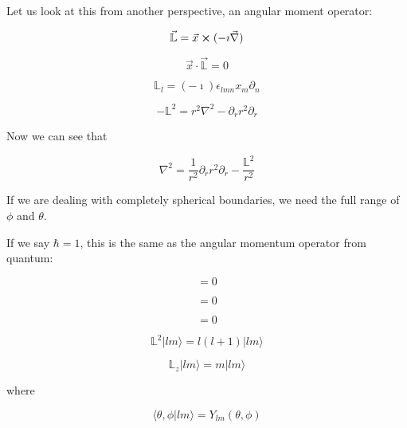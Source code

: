 \documentclass[a4paper,twoside,master.tex]{subfiles}
\begin{document}
Let us look at this from another perspective, an angular moment operator:

\begin{equation}
   \vec{\mathbb{L}} = \vec{x}\cross(-\imath\vec{\nabla})
\end{equation}

\begin{equation}
    \vec{x}\cdot\vec{\mathbb{L}} = 0
\end{equation}

\begin{equation}
    \mathbb{L}_l = (-\imath)\epsilon_{lmn}x_m\partial_n
\end{equation}

\begin{equation}
    -\mathbb{L}^2 = r^2\nabla^2 - \partial_r r^2 \partial_r
\end{equation}

Now we can see that

\begin{equation}
    \nabla^2 = \frac{1}{r^2}\partial_r r^2\partial_r - \frac{\mathbb{L}^2}{r^2}
\end{equation}

If we are dealing with completely spherical boundaries, we need the full range of $\phi$ and $\theta$.

If we say $\hbar = 1$, this is the same as the angular momentum operator from quantum:

\begin{equation}
    [\mathbb{L}^2, f(r)] = 0
\end{equation}

\begin{equation}
    [\mathbb{L}^2,\mathbb{L}_z] = 0
\end{equation}

\begin{equation}
    [\mathbb{L}_z, f(r)] = 0
\end{equation}

\begin{equation}
    \mathbb{L}^2|lm\rangle = l(l+1)|lm\rangle
\end{equation}

\begin{equation}
    \mathbb{L}_z|lm\rangle = m|lm\rangle
\end{equation}

where

\begin{equation}
    \langle\theta,\phi|lm\rangle = Y_{lm}(\theta,\phi)
\end{equation}
\end{document}
